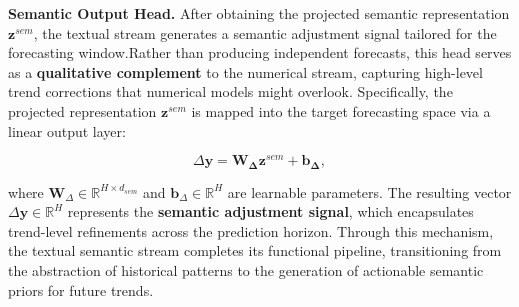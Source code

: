 \documentclass[Afour,sageh,times]{sagej}
\begin{document}
{%


\textbf{Semantic Output Head.} After obtaining the projected semantic representation $\mathbf{z}^{sem}$, the textual stream generates a semantic adjustment signal tailored for the forecasting window.Rather than producing independent forecasts, this head serves as a \textbf{qualitative complement} to the numerical stream, capturing high-level trend corrections that numerical models might overlook. Specifically, the projected representation $\mathbf{z}^{sem}$ is mapped into the target forecasting space via a linear output layer:

\begin{equation}
\Delta \mathbf{y} = \mathbf{W_\Delta} \mathbf{z}^{sem} + \mathbf{b_\Delta},
\end{equation}

where $\mathbf{W}_{\Delta} \in \mathbb{R}^{H \times d_{sem}}$ and $\mathbf{b}_{\Delta} \in \mathbb{R}^H$ are learnable parameters. The resulting vector $\Delta \mathbf{y} \in \mathbb{R}^H$ represents the \textbf{semantic adjustment signal}, which encapsulates trend-level refinements across the prediction horizon. Through this mechanism, the textual semantic stream completes its functional pipeline, transitioning from the abstraction of historical patterns to the generation of actionable semantic priors for future trends.


}
\end{document}
